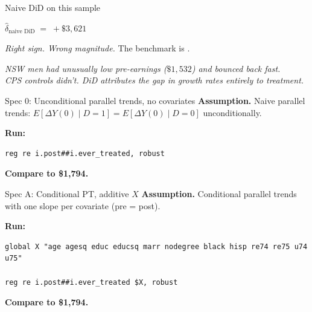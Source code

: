 \documentclass[11pt,aspectratio=169]{beamer}
\begin{document}
\begin{frame}{Naive DiD on this sample}
\vspace{1.2em}
\begin{center}
\Large
$\widehat{\delta}_{\text{naive DiD}} \;=\; +\$3{,}621$
\end{center}
\vspace{0.6em}
\begin{center}
\large
\textit{Right sign. \;Wrong magnitude.} \;The benchmark is \;.
\end{center}
\vspace{0.8em}
\begin{center}
\small\color{warmgray}\itshape
NSW men had unusually low pre-earnings ($\$1{,}532$) and bounced back fast. \\
CPS controls didn't. \;DiD attributes the gap in growth rates entirely to treatment.
\end{center}
\end{frame}


\begin{frame}[fragile]{Spec 0: Unconditional parallel trends, no covariates}
\textbf{Assumption.} \;Naive parallel trends: $E[\Delta Y(0) \mid D{=}1] = E[\Delta Y(0) \mid D{=}0]$ unconditionally.
\vspace{0.6em}

\textbf{Run:}
\begin{lstlisting}[language={[ANSI]C},basicstyle=\ttfamily\small]
reg re i.post##i.ever_treated, robust
\end{lstlisting}

\vspace{0.4em}
\textbf{Compare to \$1,794.}
\end{frame}

\begin{frame}[fragile]{Spec A: Conditional PT, additive $X$}
\textbf{Assumption.} \;Conditional parallel trends with one slope per covariate (pre = post).
\vspace{0.6em}

\textbf{Run:}
\begin{lstlisting}[language={[ANSI]C},basicstyle=\ttfamily\small]
global X "age agesq educ educsq marr nodegree black hisp re74 re75 u74 u75"

reg re i.post##i.ever_treated $X, robust
\end{lstlisting}

\vspace{0.4em}
\textbf{Compare to \$1,794.}
\end{frame}
\end{document}
